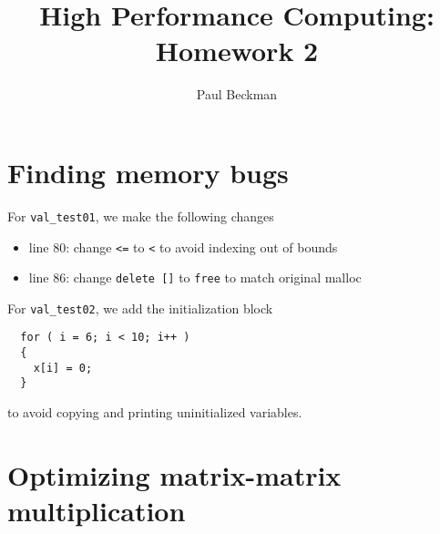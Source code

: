 \documentclass{article}
\title{High Performance Computing: Homework 2}
\author{Paul Beckman}
\date{}
\begin{document}
\maketitle

\section{Finding memory bugs}
For \texttt{val\_test01}, we make the following changes
\begin{itemize}
  \item line 80: change \texttt{<=} to \texttt{<} to avoid indexing out of
  bounds 
  \item line 86: change \texttt{delete []} to \texttt{free} to match original
  malloc
\end{itemize}

For \texttt{val\_test02}, we add the initialization block
\begin{verbatim}
  for ( i = 6; i < 10; i++ )
  {
    x[i] = 0;
  }
\end{verbatim}
to avoid copying and printing uninitialized variables.

\section{Optimizing matrix-matrix multiplication}
\end{document}
